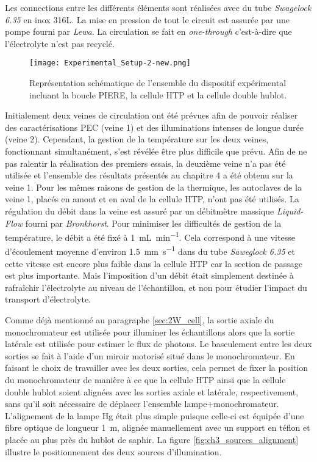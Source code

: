 \begin{refsection}
    Les connections entre les différents éléments sont réalisées avec du tube \emph{Swagelock 6.35} en inox 316L. 
    La mise en pression de tout le circuit est assurée par une pompe fourni par \emph{Lewa}. La circulation se fait en
    \emph{one-through} c'est-à-dire que l'électrolyte n'est pas recyclé.   

    \begin{figure}[H]
        \centering
        \texttt{[image: Experimental\_Setup-2-new.png]}
        \caption{Représentation schématique de l'ensemble du dispositif expérimental incluant la boucle PIERE, la
        cellule HTP et la cellule double hublot.}
        \label{fig:complete_experimental_setup}
    \end{figure}
    Initialement deux veines de circulation ont été prévues afin de pouvoir
    réaliser des caractérisations PEC (veine 1) et des illuminations intenses de longue durée (veine 2). Cependant, la gestion de la température sur
    les deux veines, fonctionnant simultanément, s'est révélée être plus difficile que prévu. 
    Afin de ne pas ralentir la réalisation des
    premiers essais, la deuxième veine n'a pas été utilisée et l'ensemble des résultats présentés
    au chapitre 4 a été obtenu sur la veine 1. Pour les mêmes raisons de gestion de la
    thermique, les autoclaves de la veine 1, placés en amont et en aval de la cellule HTP, n'ont pas été
    utilisés. La régulation du débit dans la veine est assuré par un débitmètre massique \emph{Liquid-Flow} 
    fourni par \emph{Bronkhorst}.
    Pour minimiser les difficultés de gestion de la température, le débit a été fixé à
    \SI{1}{\milli\liter\per\minute}. Cela correspond à une vitesse d'écoulement moyenne d'environ
    \SI{1.5}{\milli\meter\per\second} dans du tube \emph{Saweglock 6.35} et cette vitesse est encore plus faible dans la
    cellule HTP car la section de passage est plus importante. Mais l'imposition d'un débit était simplement destinée
    à rafraîchir l'électrolyte au niveau de l'échantillon, et non pour étudier l'impact du transport d'électrolyte.

    Comme déjà mentionné au paragraphe \ref{sec:2W_cell}, la sortie axiale du monochromateur est utilisée pour
    illuminer les échantillons alors que la sortie latérale est utilisée pour estimer le flux
    de photons. Le basculement entre les deux sorties se fait à l'aide d'un miroir motorisé situé dans le monochromateur.
    En faisant le choix de travailler avec les deux sorties, cela permet de fixer la position du
    monochromateur de manière à ce que la cellule HTP ainsi que la cellule double hublot soient alignées
    avec les sorties axiale et latérale, respectivement, sans qu'il soit nécessaire de déplacer
    l'ensemble lampe+monochromateur.   
    L'alignement de la lampe Hg était plus simple puisque celle-ci est équipée d'une fibre optique de longueur
    \SI{1}{\meter}, alignée manuellement avec un support en téflon et placée au plus près du
    hublot de saphir. 
    La figure \ref{fig:ch3_sources_alignment} illustre le positionnement des deux sources d'illumination.
      

\end{refsection}
